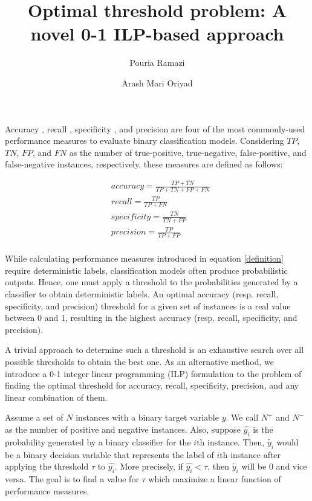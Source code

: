 \documentclass[a4paper]{article}
\title{Optimal threshold problem: A novel 0-1 ILP-based approach}
\date{}
\author[1]{Pouria Ramazi}
\author[2]{Arash Mari Oriyad}
\affil[1]{Department of Mathematics and Statistics, Brock University, St. Catharines, L2S 3A1, ON, Canada}
\affil[2]{Department of Electrical and Computer Engineering, Isfahan University of Technology, Isfahan 84156-83111, Iran}
\begin{document}
\maketitle



Accuracy \cite{accuracy}, recall \cite{recall}, specificity \cite{specificity}, and precision are four of the most commonly-used performance measures to evaluate binary classification models. Considering $TP$, $TN$, $FP$, and $FN$ as the number of true-positive, true-negative, false-positive, and false-negative instances, respectively, these measures are defined as follows:

\begin{equation}
\label{definition}
\begin{aligned}
&accuracy = \frac{TP + TN}{TP + TN + FP + FN}\\
&recall = \frac{TP}{TP + FN}\\
&specificity=\frac{TN}{TN + FP}\\
&precision= \frac{TP}{TP + FP}\\
\end{aligned}
\end{equation}

While calculating performance measures introduced in equation \ref{definition} require deterministic labels, classification models often produce probabilistic outputs. Hence, one must apply a threshold to the probabilities generated by a classifier to obtain deterministic labels. An optimal accuracy (resp. recall, specificity, and precision) threshold for a given set of instances is a real value between 0 and 1, resulting in the highest accuracy (resp. recall, specificity, and precision).

A trivial approach to determine such a threshold is an exhaustive search over all possible thresholds to obtain the best one. As an alternative method, we introduce a 0-1 integer linear programming (ILP) formulation to the problem of finding the optimal threshold for accuracy, recall, specificity, precision, and any linear combination of them.

Assume a set of $N$ instances with a binary target variable $y$. We call $N^+$ and $N^-$ as the number of positive and negative instances. Also, suppose $\hat{y_i}$ is the probability generated by a binary classifier for the $i$th instance. Then, $\tilde{y_i}$ would be a binary decision variable that represents the label of $i$th instance after applying the threshold $\tau$ to $\hat{y_i}$. More precisely, if $\hat{y_i} < \tau$, then $\tilde{y_i}$ will be $0$ and vice versa. The goal is to find a value for $\tau$ which maximize a linear function of performance measures.
\end{document}
